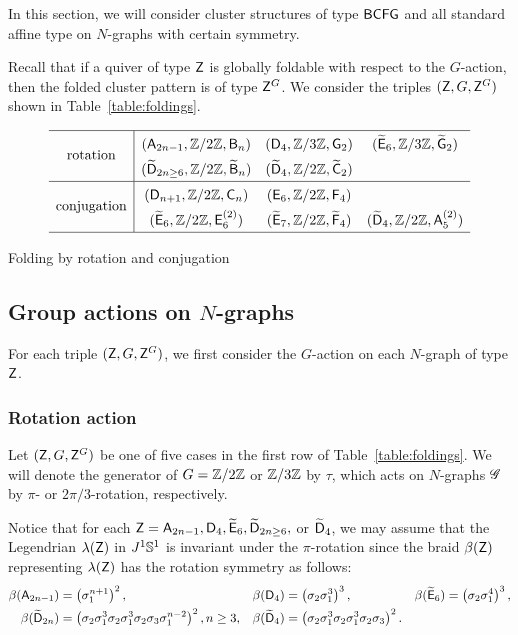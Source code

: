 In this section, we will consider cluster structures of type $\mathsf{BCFG}$ and all standard affine type on $N$-graphs with certain symmetry.

Recall that if a quiver of type $\mathsf{Z}$ is globally foldable with respect to the $G$-action, then the folded cluster pattern is of type ${\mathsf{Z}^G}$.
We consider the triples $(\mathsf{Z}, G, {\mathsf{Z}^G})$ shown in Table~\ref{table:foldings}.

\begin{table}[ht]
\[
\renewcommand\arraystretch{1.5}
\begin{array}{c|cccc}
\hline
\multirow{2}{*}{\text{rotation}}
&(\dynA_{2n-1},\Z/2\Z, \dynB_n)
&(\dynD_4,\Z/3\Z, \dynG_2)
&(\exdynE_6,\Z/3\Z, \exdynG_2)\\
%
&(\exdynD_{2n\ge6},\Z/2\Z, \exdynB_n)
&(\exdynD_4,\Z/2\Z, \exdynC_2)
\\
\hline
%
\multirow{2}{*}{\text{conjugation}}
&(\dynD_{n+1},\Z/2\Z, \dynC_n)
&(\dynE_{6},\Z/2\Z, \dynF_4)\\
&(\exdynE_6,\Z/2\Z, \dynE_6^{(2)})
&(\exdynE_7,\Z/2\Z, \exdynF_4)
&(\exdynD_4,\Z/2\Z, \dynA_5^{(2)})\\
\hline
\end{array}
\]
\caption{Folding by rotation and conjugation}
\label{table:foldings}
\end{table}


\subsection{Group actions on \texorpdfstring{$N$}{N}-graphs}

For each triple $(\mathsf{Z}, G, {\mathsf{Z}^G})$, we first consider the $G$-action on each $N$-graph of type $\mathsf{Z}$.

\subsubsection{Rotation action}
Let $(\mathsf{Z}, G, {\mathsf{Z}^G})$ be one of five cases in the first row of Table~\ref{table:foldings}.
We will denote the generator of $G=\mathbb{Z}/2\mathbb{Z}$ or $\mathbb{Z}/3\mathbb{Z}$ by $\tau$, which acts on $N$-graphs $\mathscr{G}$ by $\pi$- or $2\pi/3$-rotation, respectively.

Notice that for each $\mathsf{Z}=\mathsf{A}_{2n-1}, \mathsf{D}_4, \widetilde{\mathsf{E}}_6, \widetilde{\mathsf{D}}_{2n\ge6},$ or $\widetilde{\mathsf{D}}_4$, we may assume that the Legendrian $\lambda(\mathsf{Z})$ in $J^1\mathbb{S}^1$ is invariant under the $\pi$-rotation since the braid $\beta(\mathsf{Z})$ representing $\lambda(\mathsf{Z})$ has the rotation symmetry as follows:
\begin{align*}
\beta(\mathsf{A}_{2n-1})&=\left(\sigma_1^{n+1}\right)^2,&
\beta(\mathsf{D}_4) &=\left(\sigma_2\sigma_1^3\right)^3,&
\beta(\widetilde{\mathsf{E}}_6)&=\left(\sigma_2\sigma_1^4\right)^3,\\
\beta(\widetilde{\mathsf{D}}_{2n})&=\left(\sigma_2\sigma_1^3\sigma_2\sigma_1^3\sigma_2\sigma_3\sigma_1^{n-2}\right)^2,n\ge 3,&
\beta(\widetilde{\mathsf{D}}_4)&=\left(\sigma_2\sigma_1^3\sigma_2\sigma_1^3\sigma_2\sigma_3\right)^2.
\end{align*}

